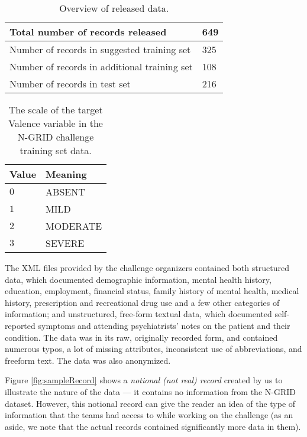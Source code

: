 \begin{table}
    \centering
    \begin{tabular}{|l|l|}
    \hline
    Total number of records released & 649  \\
    \hline
    Number of records in suggested training set    & 325  \\
    \hline
    Number of records in additional training set    & 108  \\
    \hline
    Number of records in test set   & 216 \\
    \hline
    \end{tabular}
    \caption{Overview of released data.}
    \label{tab:data1}
\end{table}


\begin{table}
\centering
    \begin{tabular}{|l|l|}
    \hline
    \textsf{Value} & \textsf{Meaning}\\
    \hline
    $0$  & \textsf{ABSENT}\\
    $1$  & \textsf{MILD}\\
    $2$  & \textsf{MODERATE}\\
    $3$  & \textsf{SEVERE}\\
    \hline
    \end{tabular}
    \caption{The scale of the target \textsf{Valence} variable in the N-GRID challenge training set data.}
    \label{tab:valence}
\end{table}

The  XML files provided by the challenge organizers contained both structured data, which documented
demographic information, mental health history, education, employment, financial status, family history of mental health, medical history, prescription and recreational drug use and a few other categories of information; and unstructured, free-form textual data, which documented self-reported symptoms and attending psychiatrists' notes on the patient and their condition. The data was in its raw, originally recorded form, and contained numerous typos, a lot of missing attributes, inconsistent use of abbreviations, and freeform text. The data was 
also anonymized.

Figure \ref{fig:sampleRecord} shows a \textit{notional (not real) record} created by us to illustrate the nature
of the data --- it contains no
information from the N-GRID dataset. However, this notional record
can give the reader an idea of the type of information that the teams had access to while working on the challenge
(as an aside, we note that the actual records contained significantly more data in them).

